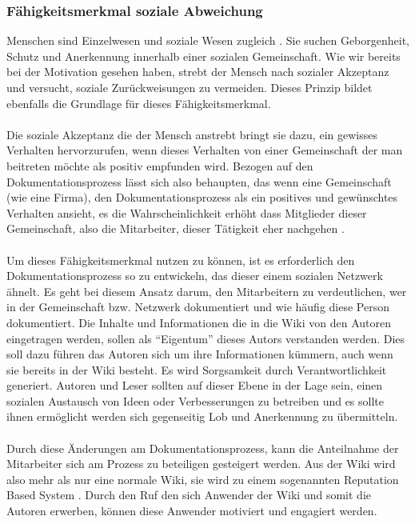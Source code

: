 \documentclass[a4paper,12pt,twoside]{scrartcl}
\begin{document}
\subsubsection{Fähigkeitsmerkmal soziale Abweichung}
Menschen sind Einzelwesen und soziale Wesen zugleich \cite{Vester2009}. Sie suchen Geborgenheit, Schutz und Anerkennung innerhalb einer sozialen Gemeinschaft. Wie wir bereits bei der Motivation gesehen haben, strebt der Mensch nach sozialer Akzeptanz und versucht, soziale Zurückweisungen zu vermeiden. Dieses Prinzip bildet ebenfalls die Grundlage für dieses Fähigkeitsmerkmal.
\\\\
Die soziale Akzeptanz die der Mensch anstrebt bringt sie dazu, ein gewisses Verhalten hervorzurufen, wenn dieses Verhalten von einer Gemeinschaft der man beitreten möchte als positiv empfunden wird. Bezogen auf den Dokumentationsprozess lässt sich also behaupten, das wenn eine Gemeinschaft (wie eine Firma), den Dokumentationsprozess als ein positives und gewünschtes Verhalten ansieht, es die Wahrscheinlichkeit erhöht dass Mitglieder dieser Gemeinschaft, also die Mitarbeiter, dieser Tätigkeit eher nachgehen \cite{Eyal2014}.
\\\\
Um dieses Fähigkeitsmerkmal nutzen zu können, ist es erforderlich den Dokumentationsprozess so zu entwickeln, das dieser einem sozialen Netzwerk ähnelt. Es geht bei diesem Ansatz darum, den Mitarbeitern zu verdeutlichen, wer in der Gemeinschaft bzw. Netzwerk dokumentiert und wie häufig diese Person dokumentiert. Die Inhalte und Informationen die in die Wiki von den Autoren eingetragen werden, sollen als “Eigentum” dieses Autors verstanden werden. Dies soll dazu führen das Autoren sich um ihre Informationen kümmern, auch wenn sie bereits in der Wiki besteht. Es wird Sorgsamkeit durch Verantwortlichkeit generiert. Autoren und Leser sollten auf dieser Ebene in der Lage sein, einen sozialen Austausch von Ideen oder Verbesserungen zu betreiben und es sollte ihnen ermöglicht werden sich gegenseitig Lob und Anerkennung zu übermitteln.
\\\\
Durch diese Änderungen am Dokumentationsprozess, kann die Anteilnahme der Mitarbeiter sich am Prozess zu beteiligen gesteigert werden. Aus der Wiki wird also mehr als nur eine normale Wiki, sie wird zu einem sogenannten Reputation Based System \cite{Prause2013}. Durch den Ruf den sich Anwender der Wiki und somit die Autoren erwerben, können diese Anwender motiviert und engagiert werden.
\end{document}

